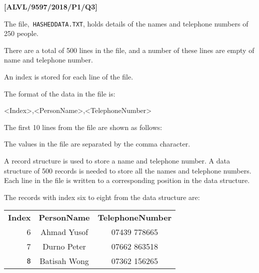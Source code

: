 \item \textbf{{[}ALVL/9597/2018/P1/Q3{]} }

The file,\texttt{ HASHEDDATA.TXT}, holds details of the names and
telephone numbers of 250 people. 

There are a total of 500 lines in the file, and a number of these
lines are empty of name and telephone number.

An index is stored for each line of the file. 

The format of the data in the file is: 
\begin{center}
<Index>,<PersonName>,<TelephoneNumber> 
\par\end{center}

The first 10 lines from the file are shown as follows: 

\noindent{}

The values in the file are separated by the comma character. 

A record structure is used to store a name and telephone number. A
data structure of 500 records is needed to store all the names and
telephone numbers. Each line in the file is written to a corresponding
position in the data structure.

The records with index six to eight from the data structure are: 
\begin{center}
\begin{tabular}{r|c|c|}
\cline{2-3} \cline{3-3} 
\textbf{Index} & \textbf{PersonName} & \textbf{TelephoneNumber}\tabularnewline
\cline{2-3} \cline{3-3} 
6 & Ahmad Yusof & 07439 778665\tabularnewline
\cline{2-3} \cline{3-3} 
7 & Durno Peter & 07662 863518\tabularnewline
\cline{2-3} \cline{3-3} 
\texttt{8} & Batisah Wong & 07362 156265\tabularnewline
\cline{2-3} \cline{3-3} 
\end{tabular}
\par\end{center}

